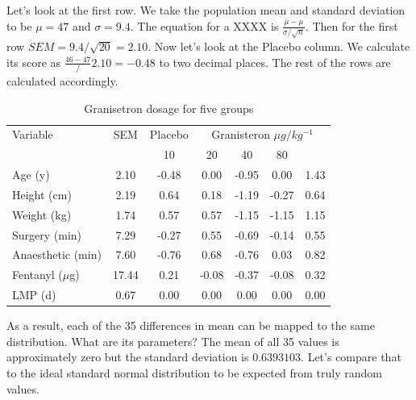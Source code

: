 \documentclass[a4paper,twosided,notoc]{tufte-book}
\begin{document}
Let's look at the first row. We take the population mean and standard deviation to be $\mu=47$ and $\sigma=9.4$. The equation for a XXXX is $\frac{\overline{\mu} - \mu}{\sigma/\sqrt{n}}$. Then for the first row $SEM=9.4/\sqrt{20} = 2.10$. Now let's look at the Placebo column. We calculate its score as $\frac{46 - 47}/2.10 = -0.48$ to two decimal places. The rest of the rows are calculated accordingly.

\begin{table}[h]
	\begin{center}
		\footnotesize
		\begin{tabular}{lcccccc}
			\toprule
			\multicolumn{1}{l}{Variable} & \multicolumn{1}{c}{SEM} & \multicolumn{1}{c}{Placebo} & \multicolumn{4}{|c|}{Granisteron $\mu g/kg^{-1}$} \\
			&  & 10 & 20 & 40 & 80 & \\
			\midrule
			Age (y)                         & 2.10  & -0.48 & 0.00  & -0.95 & 0.00  & 1.43 \\
			Height (cm)                     & 2.19  & 0.64  & 0.18  & -1.19 & -0.27 & 0.64 \\
			Weight (kg)                     & 1.74  & 0.57  & 0.57  & -1.15 & -1.15 & 1.15 \\
			Surgery (min)                   & 7.29  & -0.27 & 0.55  & -0.69 & -0.14 & 0.55 \\
			Anaesthetic (min)               & 7.60  & -0.76 & 0.68  & -0.76 & 0.03  & 0.82 \\
			Fentanyl ($\mu$g) 				& 17.44 & 0.21  & -0.08 & -0.37 & -0.08 & 0.32 \\
			LMP (d)       & 0.67  & 0.00  & 0.00  & 0.00  & 0.00  & 0.00 \\
			\bottomrule
		\end{tabular}
	\end{center}
	\caption{Granisetron dosage for five groups}
	\label{tab:heading-styles}
\end{table}

As a result, each of the 35 differences in mean can be mapped to the same distribution. What are its parameters? The mean of all 35 values is approximately zero but the standard deviation is $0.6393103$. Let's compare that to the ideal standard normal distribution to be expected from truly random values.
\end{document}
